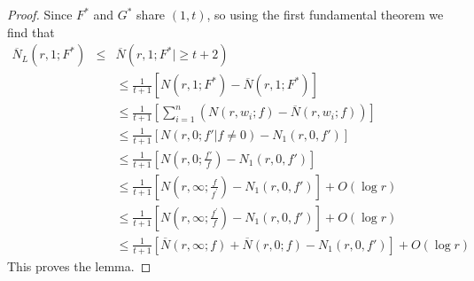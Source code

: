 \documentclass[10pt,a4paper]{amsart}
\newcommand{\bea}{\begin{eqnarray}}
\newcommand{\eea}{\end{eqnarray}}
\renewcommand{\leq}{\leqslant}\renewcommand{\geq}{\geqslant}
\newcommand{\ol}{\overline}
\begin{document}
\begin{proof}
Since $F^{*}$ and $G^{*}$  share $(1,t)$, so using the first fundamental theorem we find that
\bea  \ol{ N}_L(r,1;F^{*}) &\leq& \ol{ N}(r,1;F^{*}|\geq t+2)\nonumber\\&&
\leq \frac{1}{t+1}\left[ N(r,1;F^{*})-\ol{ N}(r,1;F^{*})\right]
\nonumber\\&&
\leq \frac{1}{t+1}\left[\sum_{i=1}^{n}\left(N(r,w_i;f)-\ol{ N}(r,w_i;f)\right)\right]	\nonumber\\&&
\leq \frac{1}{t+1}\left[N(r,0;f'|f\ne 0)-N_1(r,0,f')\right]\nonumber\\&&
\leq \frac{1}{t+1}\left[N(r,0;\frac{f'}{f})-N_1(r,0,f')\right]\nonumber\\&&
\leq \frac{1}{t+1}\left[N(r,\infty;\frac{f}{f^{'}})-N_1(r,0,f')\right]+O(\log r)\nonumber\\&&
\leq \frac{1}{t+1}\left[N(r,\infty;\frac{f^{'}}{f})-N_1(r,0,f')\right]+O(\log r)\nonumber\\&&
\leq \frac{1}{t+1}\left[\ol{ N}(r,\infty;f)+\ol{ N}(r,0;f)-N_1(r,0,f')\right]+O(\log r)\nonumber\
\eea %
This proves the lemma.
\end{proof}
\end{document}
